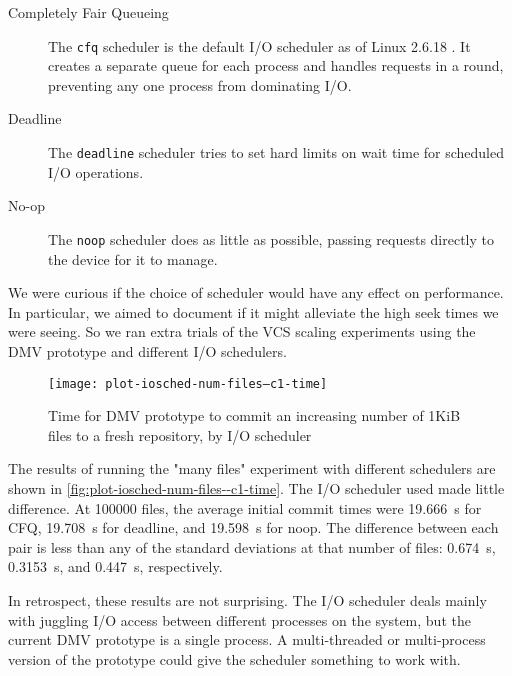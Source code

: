 \begin{description}

    \item[Completely Fair Queueing] The \lstinline{cfq} scheduler is the default
        I/O scheduler as of Linux 2.6.18 \cite{cfq_default_linux_release_notes}.
        It creates a separate queue for each process and handles requests in a
        round, preventing any one process from dominating I/O.

    \item[Deadline] The \lstinline{deadline} scheduler tries to set hard limits
        on wait time for scheduled I/O operations.

    \item[No-op] The \lstinline{noop} scheduler does as little as possible,
        passing requests directly to the device for it to manage.

\end{description}

We were curious if the choice of scheduler would have any effect on performance.
In particular, we aimed to document if it might alleviate the high seek times we
were seeing. So we ran extra trials of the VCS scaling experiments using the
\gls{DMV} prototype and different I/O schedulers.

\begin{figure}[]
    \caption{Time for DMV prototype to commit an increasing number of 1KiB files
    to a fresh repository, by I/O scheduler}
    \label{fig:plot-iosched-num-files--c1-time}
    \centering

    \explainlogsubfig

    \texttt{[image: plot-iosched-num-files--c1-time]}
\end{figure}

The results of running the "many files" experiment with different schedulers are
shown in \autoref{fig:plot-iosched-num-files--c1-time}. The I/O scheduler used
made little difference. At \num{100000} files, the average initial \gls{commit}
times were \SI{19.666}{\s} for CFQ, \SI{19.708}{\s} for deadline, and
\SI{19.598}{\s} for noop. The difference between each pair is less than any of
the standard deviations at that number of files: \SI{0.674}{\s},
\SI{0.3153}{\s}, and \SI{0.447}{\s}, respectively.

In retrospect, these results are not surprising. The I/O scheduler deals mainly
with juggling I/O access between different processes on the system, but the
current \gls{DMV} prototype is a single process. A multi-threaded or
multi-process version of the prototype could give the scheduler something to
work with.

%
